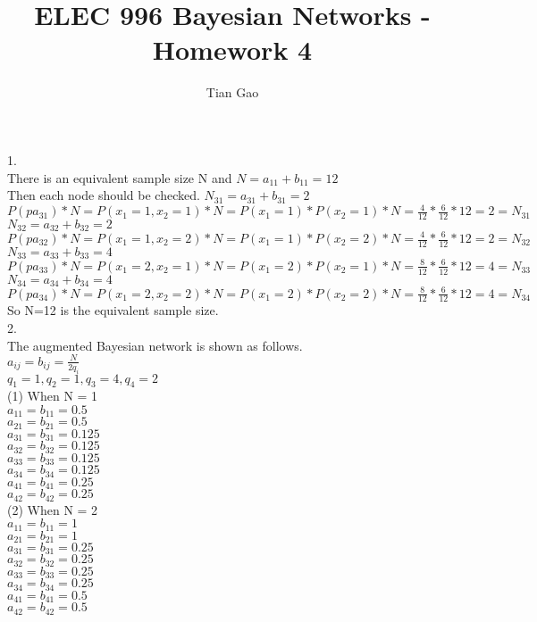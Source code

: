 \documentclass[a4paper]{article}
\title{ELEC 996 Bayesian Networks - Homework 4}
\author{Tian Gao}
\begin{document}
\maketitle

1. \\
There is an equivalent sample size N and $N = a_{11} + b_{11} = 12$ \\
Then each node should be checked.
$N_{31}=a_{31}+b_{31}=2$\\
$P(pa_{31}) * N = P(x_1=1,x_2=1) * N = P(x_1=1) * P(x_2=1) * N = \frac{4}{12} * \frac{6}{12} * 12=2=N_{31}$\\
$N_{32}=a_{32}+b_{32}=2$\\
$P(pa_{32}) * N = P(x_1=1,x_2=2) * N = P(x_1=1) * P(x_2=2) * N = \frac{4}{12} * \frac{6}{12} * 12=2=N_{32}$\\
$N_{33}=a_{33}+b_{33}=4$\\
$P(pa_{33}) * N = P(x_1=2,x_2=1) * N = P(x_1=2) * P(x_2=1) * N = \frac{8}{12} * \frac{6}{12} * 12=4=N_{33}$\\
$N_{34}=a_{34}+b_{34}=4$\\
$P(pa_{34}) * N = P(x_1=2,x_2=2) * N = P(x_1=2) * P(x_2=2) * N = \frac{8}{12} * \frac{6}{12} * 12=4=N_{34}$\\
So N=12 is the equivalent sample size.\\

2. \\
The augmented Bayesian network is shown as follows.\\
$a_{ij}=b_{ij}=\frac{N}{2q_i}$\\ 
$q_1=1, q_2=1, q_3=4, q_4=2$\\
(1) When N = 1\\
$a_{11}=b_{11}=0.5$\\ 
$a_{21}=b_{21}=0.5$\\
$a_{31}=b_{31}=0.125$\\
$a_{32}=b_{32}=0.125$\\
$a_{33}=b_{33}=0.125$\\
$a_{34}=b_{34}=0.125$\\
$a_{41}=b_{41}=0.25$\\
$a_{42}=b_{42}=0.25$\\

(2) When N = 2\\
$a_{11}=b_{11}=1$\\ 
$a_{21}=b_{21}=1$\\
$a_{31}=b_{31}=0.25$\\
$a_{32}=b_{32}=0.25$\\
$a_{33}=b_{33}=0.25$\\
$a_{34}=b_{34}=0.25$\\
$a_{41}=b_{41}=0.5$\\
$a_{42}=b_{42}=0.5$\\
\end{document}
